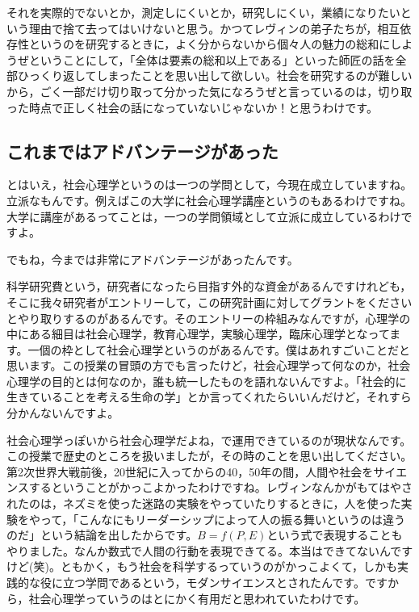 \documentclass{ltjsbook}
\begin{document}
それを実際的でないとか，測定しにくいとか，研究しにくい，業績になりたいという理由で捨て去ってはいけないと思う。かつてレヴィンの弟子たちが，相互依存性というのを研究するときに，よく分からないから個々人の魅力の総和にしようぜということにして，「全体は要素の総和以上である」といった師匠の話を全部ひっくり返してしまったことを思い出して欲しい。社会を研究するのが難しいから，ごく一部だけ切り取って分かった気になろうぜと言っているのは，切り取った時点で正しく社会の話になっていないじゃないか！と思うわけです。

\subsection{これまではアドバンテージがあった}

とはいえ，社会心理学というのは一つの学問として，今現在成立していますね。立派なもんです。例えばこの大学に社会心理学講座というのもあるわけですね。大学に講座があるってことは，一つの学問領域として立派に成立しているわけですよ。

でもね，今までは非常にアドバンテージがあったんです。

科学研究費という，研究者になったら目指す外的な資金があるんですけれども，そこに我々研究者がエントリーして，この研究計画に対してグラントをくださいとやり取りするのがあるんです。そのエントリーの枠組みなんですが，心理学の中にある細目は社会心理学，教育心理学，実験心理学，臨床心理学となってます。一個の枠として社会心理学というのがあるんです。僕はあれすごいことだと思います。この授業の冒頭の方でも言ったけど，社会心理学って何なのか，社会心理学の目的とは何なのか，誰も統一したものを語れないんですよ。「社会的に生きていることを考える生命の学」とか言ってくれたらいいんだけど，それすら分かんないんですよ。

社会心理学っぽいから社会心理学だよね，で運用できているのが現状なんです。この授業で歴史のところを扱いましたが，その時のことを思い出してください。第2次世界大戦前後，20世紀に入ってからの40，50年の間，人間や社会をサイエンスするということがかっこよかったわけですね。レヴィンなんかがもてはやされたのは，ネズミを使った迷路の実験をやっていたりするときに，人を使った実験をやって，「こんなにもリーダーシップによって人の振る舞いというのは違うのだ」という結論を出したからです。$B=f(P,E)$という式で表現することもやりました。なんか数式で人間の行動を表現できてる。本当はできてないんですけど(笑)。ともかく，もう社会を科学するっていうのがかっこよくて，しかも実践的な役に立つ学問であるという，モダンサイエンスとされたんです。ですから，社会心理学っていうのはとにかく有用だと思われていたわけです。
\end{document}
